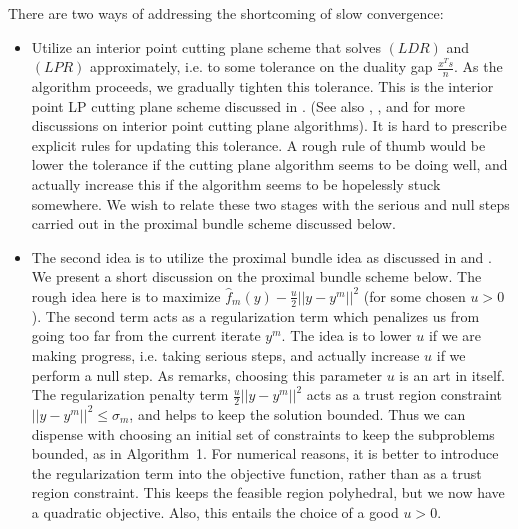 \documentclass[12pt]{kluwer}
\begin{document}
\begin{article}
There are two ways of addressing the shortcoming of slow convergence:
\begin{itemize}
\item Utilize an interior point cutting plane scheme that solves $(LDR)$ and $(LPR)$ approximately, i.e.
to some tolerance on the duality gap $\frac{x^Ts}{n}$. As the algorithm proceeds, we gradually tighten
this tolerance. This is the interior point LP cutting plane scheme discussed in .
(See also , , and
 for more discussions on interior point cutting plane algorithms).
It is hard to prescribe explicit rules for updating this tolerance. A rough rule of thumb would be lower the tolerance
if the cutting plane algorithm seems to be doing well, and actually increase this if the algorithm seems to be hopelessly
stuck somewhere. We wish to relate these two stages with the serious and null steps carried out in the proximal bundle
scheme discussed below.
\item The second idea is to utilize the proximal bundle idea as discussed in  and
. We present a short discussion on the proximal bundle scheme below. The rough idea here
is to maximize $\hat{f}_m(y) - \frac{u}{2}||y-y^m||^2$ (for some chosen $u > 0$). The second term acts as a regularization
term which penalizes us from going too far from the current iterate $y^m$. The idea is to lower $u$ if we are
making progress, i.e. taking serious steps, and actually increase $u$ if we perform a null step. As 
remarks, choosing this parameter $u$ is an art in itself. The regularization penalty term $\frac{u}{2}||y-y^m||^2$
acts as a trust region constraint $||y-y^m||^2 \le \sigma_m$, and helps to keep the solution bounded. Thus we
can dispense with choosing an initial set of constraints to keep the subproblems bounded, as in Algorithm~1. For numerical
reasons, it is better to introduce the regularization term into the objective function, rather than as a trust region
constraint. This keeps the feasible region polyhedral, but we now have a quadratic objective.
Also, this entails the choice of a good $u > 0$.
\end{itemize}


\end{article}
\end{document}
